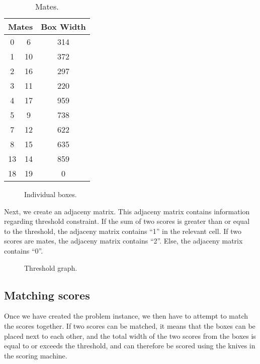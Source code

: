 \documentclass[a4paper, 11pt, twoside, onecolumn, openany]{article}
\begin{document}
\begin{table}[!htb]
	\centering
	\begin{tabular}{|c|c|c|}
	\hline
	\multicolumn{2}{|c|}{Mates} & Box Width \\ \hline
	0 & 6 & 314 \\ \hline
	1 & 10 & 372 \\ \hline
	2 & 16 & 297 \\ \hline
	3 & 11 & 220 \\ \hline
	4 & 17 & 959 \\ \hline
	5 & 9 & 738 \\ \hline
	7 & 12 & 622 \\ \hline
	8 & 15 & 635 \\ \hline
	13 & 14 & 859 \\ \hline
	18 & 19 & 0 \\
	\hline
	\end{tabular}
	\caption{Mates.}
	\label{table:mates}
\end{table}	

\begin{figure}[!htb]	
	\centering
	
	\caption{Individual boxes.}	
	\label{fig:boxes}
\end{figure}

Next, we create an adjaceny matrix. This adjaceny matrix contains information regarding threshold constraint. If the sum of two scores is greater than or equal to the threshold, the adjaceny matrix contains ``1'' in the relevant cell. If two scores are mates, the adjaceny matrix contains ``2''. Else, the adjaceny matrix contains ``0''. %

\begin{figure}[!htb]
	\centering
	
	\caption{Threshold graph.}
	\label{fig:threshold}	
\end{figure}



\subsection{Matching scores}
Once we have created the problem instance, we then have to attempt to match the scores together. If two scores can be matched, it means that the boxes can be placed next to each other, and the total width of the two scores from the boxes is equal to or exceeds the threshold, and can therefore be scored using the knives in the scoring machine. 
\end{document}
